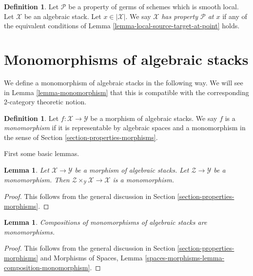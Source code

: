\documentclass{stacks-project}
\theoremstyle{plain}
\newtheorem{lemma}[subsection]{Lemma}
\theoremstyle{definition}
\newtheorem{definition}[subsection]{Definition}
\theoremstyle{remark}
\numberwithin{equation}{subsection}
\begin{document}
\begin{definition}
\label{definition-property-at-point}
Let $\mathcal{P}$ be a property of germs of schemes which is
smooth local. Let $\mathcal{X}$ be an algebraic stack.
Let $x \in |\mathcal{X}|$.
We say $\mathcal{X}$ {\it has property $\mathcal{P}$ at $x$}
if any of the equivalent conditions of
Lemma \ref{lemma-local-source-target-at-point}
holds.
\end{definition}










\section{Monomorphisms of algebraic stacks}
\label{section-monomorphisms}

\noindent
We define a monomorphism of algebraic stacks in the following way.
We will see in
Lemma \ref{lemma-monomorphism}
that this is compatible with the corresponding $2$-category theoretic notion.

\begin{definition}
\label{definition-monomorphism}
Let $f : \mathcal{X} \to \mathcal{Y}$ be a morphism of algebraic stacks.
We say $f$ is a {\it monomorphism}
if it is representable by algebraic spaces and a monomorphism in the sense of
Section \ref{section-properties-morphisms}.
\end{definition}

\noindent
First some basic lemmas.

\begin{lemma}
\label{lemma-base-change-monomorphism}
Let $\mathcal{X} \to \mathcal{Y}$ be a morphism of algebraic stacks.
Let $\mathcal{Z} \to \mathcal{Y}$ be a monomorphism.
Then $\mathcal{Z} \times_\mathcal{Y} \mathcal{X} \to \mathcal{X}$
is a monomorphism.
\end{lemma}

\begin{proof}
This follows from the general discussion in
Section \ref{section-properties-morphisms}.
\end{proof}

\begin{lemma}
\label{lemma-composition-monomorphism}
Compositions of monomorphisms of algebraic stacks are monomorphisms.
\end{lemma}

\begin{proof}
This follows from the general discussion in
Section \ref{section-properties-morphisms}
and
Morphisms of Spaces,
Lemma \ref{spaces-morphisms-lemma-composition-monomorphism}.
\end{proof}
\end{document}

